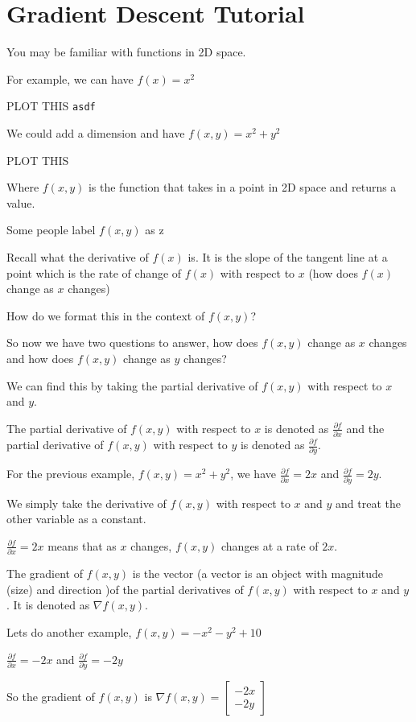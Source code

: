 \documentclass{article}
\author{David Saldubehere}
\begin{document}
\section{Gradient Descent Tutorial}
You may be familiar with functions in 2D space.

For example, we can have \(f(x) = x^2\)

PLOT THIS
\verb|asdf|

We could add a dimension and have $f(x, y) = x^2 + y^2$

PLOT THIS

Where $f(x, y)$ is the function that takes in a point in 2D space and returns a value.

Some people label $f(x, y)$ as z

Recall what the derivative of $f(x)$ is. It is the slope of the tangent line at a point which is the rate of change of $f(x)$ with respect to $x$ (how does $f(x)$ change as $x$ changes) 

How do we format this in the context of $f(x, y)$?

So now we have two questions to answer, how does $f(x, y)$ change as $x$ changes and how does $f(x, y)$ change as $y$ changes?

We can find this by taking the partial derivative of $f(x, y)$ with respect to $x$ and $y$.

The partial derivative of $f(x, y)$ with respect to $x$ is denoted as $\frac{\partial f}{\partial x}$ and the partial derivative of $f(x, y)$ with respect to $y$ is denoted as $\frac{\partial f}{\partial y}$.

For the previous example, $f(x, y) = x^2 + y^2$, we have $\frac{\partial f}{\partial x} = 2x$ and $\frac{\partial f}{\partial y} = 2y$.

We simply take the derivative of $f(x, y)$ with respect to $x$ and $y$ and treat the other variable as a constant.

$\frac{\partial f}{\partial x} = 2x$ means that as $x$ changes, $f(x, y)$ changes at a rate of $2x$.

The gradient of $f(x, y)$ is the vector (a vector is an object with magnitude (size) and direction )of the partial derivatives of $f(x, y)$ with respect to $x$ and $y$. It is denoted as $\nabla f(x, y)$.

Lets do another example, $f(x, y) = -x^2 -y^2 + 10$

$\frac{\partial f}{\partial x} = -2x$ and $\frac{\partial f}{\partial y} = -2y$

So the gradient of $f(x, y)$ is $\nabla f(x, y) = \begin{bmatrix} -2x \\ -2y \end{bmatrix}$
\end{document}
